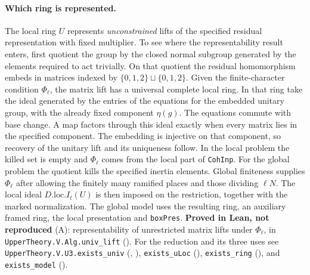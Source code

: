 \paragraph{Which ring is represented.}
The local ring $U$ represents \emph{unconstrained} lifts of the specified
residual representation with fixed multiplier. To see where the
representability result enters, first quotient the group by the closed
normal subgroup generated by the elements required to act trivially.
On that quotient the residual homomorphism embeds in matrices indexed by
$\{0,1,2\}\sqcup\{0,1,2\}$. Given the finite-character condition
$\Phi_\ell$, the matrix lift has a universal complete local ring.
In that ring take the ideal generated by the entries of the equations
for the embedded unitary group, with the already fixed component
$\eta(g)$. The equations commute with base change. A map factors through
this ideal exactly when every matrix lies in the specified component.
The embedding is injective on that component, so recovery of the unitary
lift and its uniqueness follow. In the local problem the killed set
is empty and $\Phi_\ell$ comes from the local part of \nolinkurl{CohInp}.
For the global problem the quotient kills the specified inertia elements.
Global finiteness supplies $\Phi_\ell$ after allowing the finitely many
ramified places and those dividing $\ell N$. The local ideal
$D.\mathrm{loc}.I_t(U)$ is then imposed on the restriction, together
with the marked normalization. The global model uses the resulting
ring, an auxiliary framed ring, the local presentation and
\nolinkurl{boxPres}. \textbf{Proved in Lean, not reproduced} (A):
representability of unrestricted matrix lifts under $\Phi_\ell$, in
\nolinkurl{UpperTheory.V.Alg.univ_lift}
().
For the reduction and its three uses see
\nolinkurl{UpperTheory.V.U3.exists_univ}
(, ),
\nolinkurl{exists_uLoc} (),
\nolinkurl{exists_ring} (), and
\nolinkurl{exists_model} ().


